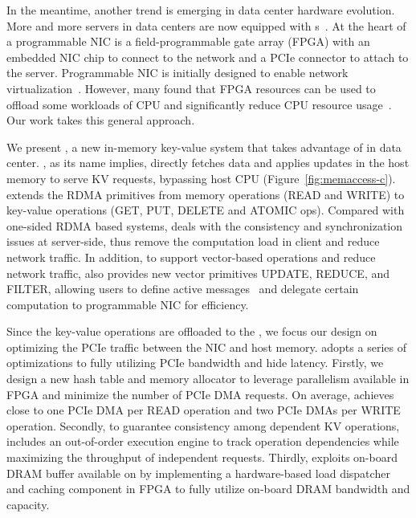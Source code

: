 In the meantime, another trend is emerging in data center hardware evolution. More and more servers in data centers are now equipped with \ournic{}s~\cite{caulfield2016cloud, greenberg2015sdn,putnam2014reconfigurable}.
At the heart of a programmable NIC is a field-programmable gate array (FPGA) with an embedded NIC chip to connect to the network and a PCIe connector to attach to the server.
Programmable NIC is initially designed to enable network virtualization~\cite{vfp,li2016clicknp}.
However, many found that FPGA resources can be used to offload some workloads of CPU and significantly reduce CPU resource usage~\cite{ouyang14hotchips, MaZC17fpga, huang16socc, cong16dac}. Our work takes this general approach.

We present \oursys{}, a new in-memory key-value system that takes advantage of \ournic{} in data center.
\oursys{}, as its name implies, directly fetches data and applies updates in the host memory to serve KV requests, bypassing host CPU (Figure~\ref{fig:memaccess-c}).
\oursys{} extends the RDMA primitives from memory operations (READ and WRITE) to key-value operations (GET, PUT, DELETE and ATOMIC ops). Compared with one-sided RDMA based systems, \oursys{} deals with the consistency and synchronization issues at server-side, thus remove the computation load in client and reduce network traffic.
In addition, to support vector-based operations and reduce network traffic, \oursys{} also provides new vector primitives UPDATE, REDUCE, and FILTER, allowing users to define active messages~\cite{eicken1992active} and delegate certain computation to programmable NIC for efficiency.

Since the key-value operations are offloaded to the \ournic{}, we focus our design on optimizing the PCIe traffic between the NIC and host memory. \oursys{} adopts a series of optimizations to fully utilizing PCIe bandwidth and hide latency. Firstly, we design a new hash table and memory allocator to leverage parallelism available in FPGA and minimize the number of PCIe DMA requests. On average, \oursys{} achieves close to one PCIe DMA per READ operation and two PCIe DMAs per WRITE operation. Secondly, to guarantee consistency among dependent KV operations, \oursys{} includes an out-of-order execution engine to track operation dependencies while maximizing the throughput of independent requests. Thirdly, \oursys{} exploits on-board DRAM buffer available on \ournic{} by implementing a hardware-based load dispatcher and caching component in FPGA to fully utilize on-board DRAM bandwidth and capacity. 

